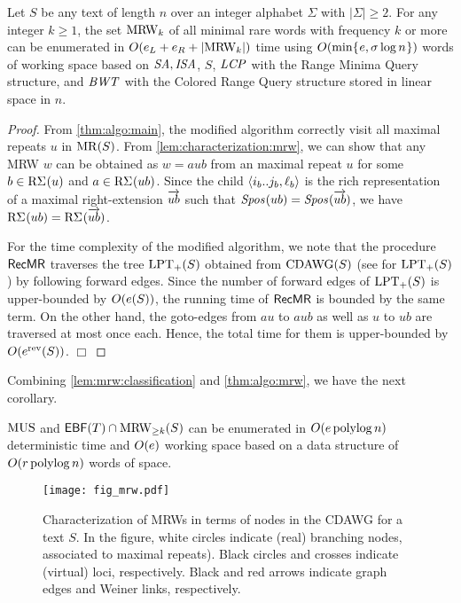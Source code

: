 \begin{theorem}\label{thm:algo:mrw}
  Let $S$ be any text of length $n$ over an integer alphabet $\Sigma$ with $|\Sigma| \ge 2$.
  For any integer $k\ge 1$, the set $\MRWK[\ge k]$ of all minimal rare words with frequency $k$ or more can be enumerated
  in $O(e_L + e_R + |\MRWK[\ge k]|)$ time
  using $O(\min\set{\eL,\sigma\log n})$ words of working space
  based on $\SA, \ISA$, $S$, $\LCP$ with the Range Minima Query structure, and $\BWT$ with the Colored Range Query structure stored in linear space in $n$. 
\end{theorem}

\begin{proof}
  From \cref{thm:algo:main}, the modified algorithm correctly visit all maximal repeats $u$ in $\MR(S)$. From \cref{lem:characterization:mrw},
we can show that any MRW $w$ can be obtained as $w = aub$ from an maximal repeat $u$ for some $b \in \RSigma[](u)$ and $a \in \RSigma[](ub)$. Since the child $\pair{i_b..j_b, \ell_b}$ is the rich representation of a maximal right-extension $\rext{ub}$ such that $\Spos[](ub) = \Spos[](\rext{ub})$, we have $\RSigma[](ub) = \RSigma[](\rext{ub})$. 

For the time complexity of the modified algorithm, we note that the procedure $\MRRec$ traverses the tree $\idrm{LPT}_+(S)$ obtained from $\CDAWG(S)$ (see \cite{inenaga2024computing} for $\idrm{LPT}_+(S)$) by following forward edges. Since the number of forward edges of  $\idrm{LPT}_+(S)$ is upper-bounded by $O(\eL(S))$, the running time of $\MRRec$ is bounded by the same term. On the other hand, the goto-edges from $au$ to $aub$ as well as $u$ to $ub$ are traversed at most once each. Hence, the total time for them is upper-bounded by $O(\eR(S))$. 
\hfill$\Box$
\end{proof}

Combining \cref{lem:mrw:classification} and \cref{thm:algo:mrw}, we have the next corollary. 

\begin{corollary}\label{thm:algo:mus:ebf}
$\MUS$  and $\EBF\cap\MRWS[\ge k](S)$ can be enumerated  in $O(\eL\polylog n)$ deterministic time and $O(\eL)$ working space based on a data structure of 
$O(r\polylog n)$
words of space. 
\end{corollary}


\begin{figure}[t]
  \centering 
  \texttt{[image: fig\_mrw.pdf]}
  \caption{Characterization of MRWs in terms of nodes in the CDAWG for a text $S$. In the figure, white circles indicate (real) branching nodes, associated to maximal repeats). Black circles and crosses indicate (virtual) loci, respectively. Black and red arrows indicate graph edges and Weiner links, respectively. 
  }\label{fig:mus}
\end{figure}

